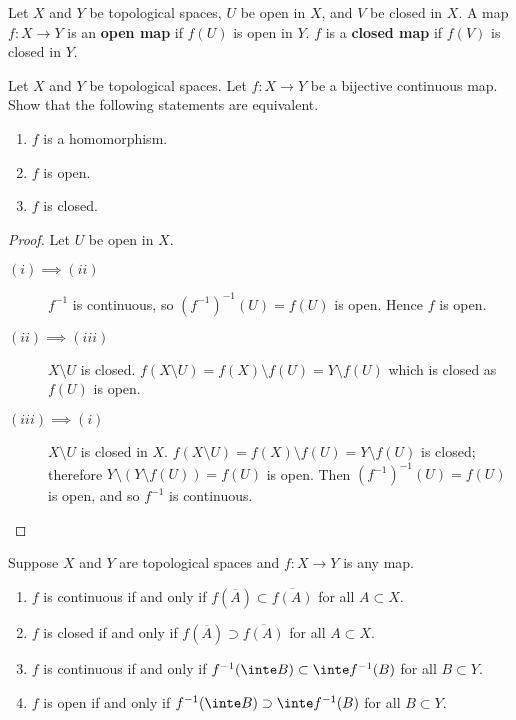 \begin{definition}
	Let $X$ and $Y$ be topological spaces, $U$ be open in $X$,
	and $V$ be closed in $X$.
	A map $f: X \to Y$ is an \textbf{open map} if $f(U)$ is open in $Y$.
	$f$ is a \textbf{closed map} if $f(V)$ is closed in $Y$.
\end{definition}

\begin{problem}
	Let $X$ and $Y$ be topological spaces.
	Let $f: X \to Y$ be a bijective continuous map.
	Show that the following statements are equivalent.
	\begin{enumerate}
		\item $f$ is a homomorphism.
		\item $f$ is open.
		\item $f$ is closed.
	\end{enumerate}
\end{problem}

\begin{proof}
	Let $U$ be open in $X$.
	\begin{description}
		\item[$(i) \implies (ii)$] 
			$f^{-1}$ is continuous, 
			so $\left(f^{-1}\right)^{-1}(U) = f(U)$ is open.
			Hence $f$ is open.

		\item[$(ii) \implies (iii)$]
			$X \setminus U$ is closed.
			$
				f(X \setminus U) 
				= f(X) \setminus f(U)
				= Y \setminus f(U)
			$ which is closed as $f(U)$ is open.

		\item[$(iii) \implies (i)$]
			$X \setminus U$ is closed in $X$.
			$
				f(X \setminus U)
				= f(X) \setminus f(U)
				= Y \setminus f(U)
			$ is closed;
			therefore $Y \setminus (Y \setminus f(U)) = f(U)$ is open.
			Then $\left(f^{-1}\right)^{-1}(U) = f(U)$ is open, and so
			$f^{-1}$ is continuous. 
	\end{description}
\end{proof}

\begin{proposition}[]
	Suppose $X$ and $Y$ are topological spaces
	and $f: X \to Y$ is any map.
	\begin{enumerate}
		\item
			$f$ is continuous if and only if
			$f(\overline A) \subset \overline{f(A)}$
			for all $A \subset X$.
		
		\item 
			$f$ is closed if and only if
			$f(\overline A) \supset \overline{f(A)}$
			for all $A \subset X$.

		\item
			$f$ is continuous if and only if
			$f^{-1}(\inte B) \subset \inte f^{-1}(B)$
			for all $B \subset Y$.
 
		\item
			$f$ is open if and only if
			$f^{-1}(\inte B) \supset \inte f^{-1}(B)$
			for all $B \subset Y$.
	\end{enumerate}
\end{proposition}

